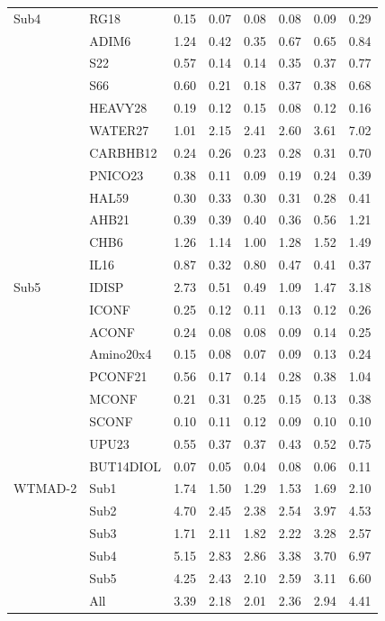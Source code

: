 \begin{ThreePartTable}
\begin{longtable}{lld{2.2}d{2.2}d{2.2}d{2.2}d{2.2}d{2.2}}
  Sub4    & RG18      & 0.15  & 0.07  & 0.08  & 0.08   & 0.09  & 0.29  \\
          & ADIM6     & 1.24  & 0.42  & 0.35  & 0.67   & 0.65  & 0.84  \\
          & S22       & 0.57  & 0.14  & 0.14  & 0.35   & 0.37  & 0.77  \\
          & S66       & 0.60  & 0.21  & 0.18  & 0.37   & 0.38  & 0.68  \\
          & HEAVY28   & 0.19  & 0.12  & 0.15  & 0.08   & 0.12  & 0.16  \\
          & WATER27   & 1.01  & 2.15  & 2.41  & 2.60   & 3.61  & 7.02  \\
          & CARBHB12  & 0.24  & 0.26  & 0.23  & 0.28   & 0.31  & 0.70  \\
          & PNICO23   & 0.38  & 0.11  & 0.09  & 0.19   & 0.24  & 0.39  \\
          & HAL59     & 0.30  & 0.33  & 0.30  & 0.31   & 0.28  & 0.41  \\
          & AHB21     & 0.39  & 0.39  & 0.40  & 0.36   & 0.56  & 1.21  \\
          & CHB6      & 1.26  & 1.14  & 1.00  & 1.28   & 1.52  & 1.49  \\
          & IL16      & 0.87  & 0.32  & 0.80  & 0.47   & 0.41  & 0.37  \\ \midrule
  Sub5    & IDISP     & 2.73  & 0.51  & 0.49  & 1.09   & 1.47  & 3.18  \\
          & ICONF     & 0.25  & 0.12  & 0.11  & 0.13   & 0.12  & 0.26  \\
          & ACONF     & 0.24  & 0.08  & 0.08  & 0.09   & 0.14  & 0.25  \\
          & Amino20x4 & 0.15  & 0.08  & 0.07  & 0.09   & 0.13  & 0.24  \\
          & PCONF21   & 0.56  & 0.17  & 0.14  & 0.28   & 0.38  & 1.04  \\
          & MCONF     & 0.21  & 0.31  & 0.25  & 0.15   & 0.13  & 0.38  \\
          & SCONF     & 0.10  & 0.11  & 0.12  & 0.09   & 0.10  & 0.10  \\
          & UPU23     & 0.55  & 0.37  & 0.37  & 0.43   & 0.52  & 0.75  \\
          & BUT14DIOL & 0.07  & 0.05  & 0.04  & 0.08   & 0.06  & 0.11  \\ \midrule
  WTMAD-2 & Sub1      & 1.74  & 1.50  & 1.29  & 1.53   & 1.69  & 2.10  \\
          & Sub2      & 4.70  & 2.45  & 2.38  & 2.54   & 3.97  & 4.53  \\
          & Sub3      & 1.71  & 2.11  & 1.82  & 2.22   & 3.28  & 2.57  \\
          & Sub4      & 5.15  & 2.83  & 2.86  & 3.38   & 3.70  & 6.97  \\
          & Sub5      & 4.25  & 2.43  & 2.10  & 2.59   & 3.11  & 6.60  \\
          & All       & 3.39  & 2.18  & 2.01  & 2.36   & 2.94  & 4.41  \\ \bottomrule
\end{longtable}
\end{ThreePartTable}

